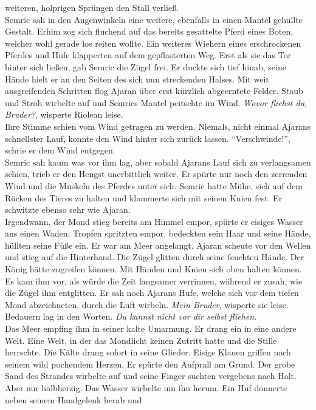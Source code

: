 weiteren, holprigen Sprüngen den Stall verließ.\\
Semric sah in den Augenwinkeln eine weitere, ebenfalls in einen Mantel gehüllte Gestalt. Erhim zog 
sich fluchend auf das bereits gesattelte Pferd eines Boten, welcher wohl gerade los reiten wollte. 
Ein weiteres Wiehern eines erschrockenen Pferdes und Hufe klapperten auf dem gepflasterten Weg. 
Erst als sie das Tor hinter sich ließen, gab Semric die Zügel frei. Er duckte sich tief hinab, 
seine Hände hielt er an den Seiten des sich nun streckenden Halses. Mit weit ausgreifenden 
Schritten flog Ajaran über erst kürzlich abgeerntete Felder. Staub und Stroh wirbelte auf und 
Semrics Mantel peitschte im Wind. \textit{Wovor fliehst du, Bruder?}, wisperte Riolean leise.\\
Ihre Stimme schien vom Wind getragen zu werden. Niemals, nicht einmal Ajarans schnellster Lauf, 
konnte den Wind hinter sich zurück lassen. ``Verschwinde!'', schrie er dem Wind entgegen. \\
Semric sah kaum was vor ihm lag, aber sobald Ajarans Lauf sich zu verlangsamen schien, trieb er den 
Hengst unerbittlich weiter. Er spürte nur noch den zerrenden Wind und die Muskeln des Pferdes unter 
sich. Semric hatte Mühe, sich auf dem Rücken des Tieres zu halten und klammerte sich mit seinen 
Knien fest. Er schwitzte ebenso sehr wie Ajaran. \\
Irgendwann, der Mond stieg bereits am Himmel empor, spürte er eisiges Wasser ans einen Waden. 
Tropfen spritzten empor, bedeckten sein Haar und seine Hände, hüllten seine Füße ein. Er war am 
Meer angelangt. Ajaran scheute vor den Wellen und stieg auf die Hinterhand. Die Zügel glitten durch 
seine feuchten Hände. Der König hätte zugreifen können. Mit Händen und Knien sich oben halten 
können. Es kam ihm vor, als würde die Zeit langsamer verrinnen, während er zusah, wie die Zügel ihm 
entglitten. Er sah noch Ajarans Hufe, welche sich vor dem tiefen Mond abzeichneten, durch die Luft 
wirbeln. \textit{Mein Bruder}, wisperte sie leise. Bedauern lag in den Worten. \textit{Du kannst 
nicht vor dir selbst fliehen.}\\
Das Meer empfing ihm in seiner kalte Umarmung. Er drang ein in eine andere Welt. Eine Welt, in der 
das Mondlicht keinen Zutritt hatte und die Stille herrschte. Die Kälte drang sofort in seine 
Glieder. Eisige Klauen griffen nach seinem wild pochendem Herzen. Er spürte den Aufprall am Grund. 
Der grobe Sand des Strandes wirbelte auf und seine Finger suchten vergebens nach Halt. Aber nur 
halbherzig. Das Wasser wirbelte um ihn herum. Ein Huf donnerte neben seinem Handgelenk herab und 
